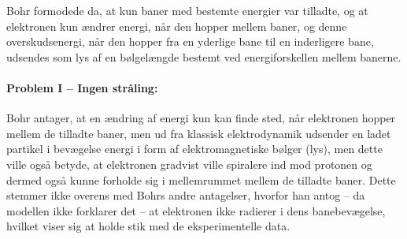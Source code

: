 Bohr formodede da, at kun baner med bestemte energier var tilladte, og at elektronen kun ændrer energi, når den hopper mellem baner, og denne overskudsenergi, når den hopper fra en yderlige bane til en inderligere bane, udsendes som lys af en bølgelængde bestemt ved energiforskellen mellem banerne.

\paragraph{Problem I -- Ingen stråling:} Bohr antager, at en ændring af energi kun kan finde sted, når elektronen hopper mellem de tilladte baner, men ud fra klassisk elektrodynamik udsender en ladet partikel i bevægelse energi i form af elektromagnetiske bølger (lys), men dette ville også betyde, at elektronen gradvist ville spiralere ind mod protonen og dermed også kunne forholde sig i mellemrummet mellem de tilladte baner. Dette stemmer ikke overens med Bohrs andre antagelser, hvorfor han antog -- da modellen ikke forklarer det -- at elektronen ikke radierer i dens banebevægelse, hvilket viser sig at holde stik med de eksperimentelle data.

